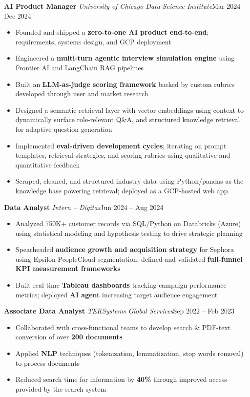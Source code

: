 \documentclass[10pt, letterpaper]{article}
\newcommand{\jobentry}[3]{%
  \noindent\textbf{#1} \textbar{} \textit{#2}\hfill #3\par\vspace{-2pt}%
}
\newenvironment{bullets}{%
  \begin{itemize}[
    leftmargin=0.125in,
    itemsep=0pt,
    parsep=0pt,
    topsep=0pt,
    partopsep=0pt,
    label=\textbullet
  ]
}{%
  \end{itemize}
}
\begin{document}
\vspace{3pt}
\jobentry{AI Product Manager}{University of Chicago Data Science Institute}{Mar 2024 -- Dec 2024}
\begin{bullets}
  \item Founded and shipped a \textbf{zero-to-one AI product end-to-end}; requirements, systems design, and GCP deployment
  \item Engineered a \textbf{multi-turn agentic interview simulation engine} using Frontier AI and LangChain RAG pipelines
  \item Built an \textbf{LLM-as-judge scoring framework} backed by custom rubrics developed through user and market research
  \item Designed a semantic retrieval layer with vector embeddings using context to dynamically surface role-relevant Q\&A, and structured knowledge retrieval for adaptive question generation
  \item Implemented \textbf{eval-driven development cycles}; iterating on prompt templates, retrieval strategies, and scoring rubrics using qualitative and quantitative feedback
  \item Scraped, cleaned, and structured industry data using Python/pandas as the knowledge base powering retrieval; deployed as a GCP-hosted web app
\end{bullets}

\vspace{3pt}
\jobentry{Data Analyst}{\selectfont Intern -- Digitas}{Jun 2024 -- Aug 2024}
\begin{bullets}
  \item Analyzed 750K+ customer records via SQL/Python on Databricks (Azure) using statistical modeling and hypothesis testing to drive strategic planning
  \item Spearheaded \textbf{audience growth and acquisition strategy} for Sephora using Epsilon PeopleCloud segmentation; defined and validated \textbf{full-funnel KPI measurement frameworks}
  \item Built real-time \textbf{Tableau dashboards} tracking campaign performance metrics; deployed \textbf{AI agent} increasing target audience engagement
\end{bullets}

\vspace{3pt}
\jobentry{Associate Data Analyst}{\selectfont TEKSystems Global Services}{Sep 2022 -- Feb 2023}
\begin{bullets}
  \item Collaborated with cross-functional teams to develop search \& PDF-text conversion of over \textbf{200 documents}
  \item Applied \textbf{NLP} techniques (tokenization, lemmatization, stop words removal) to process documents
  \item Reduced search time for information by \textbf{40\%} through improved access provided by the search system
\end{bullets}
\end{document}
